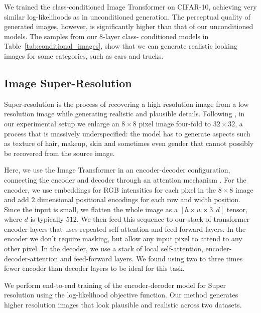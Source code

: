 \documentclass{article}
\newcommand{\height}{h}
\newcommand{\width}{w}
\newcommand{\modeldim}{d}
\begin{document}
We trained the class-conditioned Image Transformer on CIFAR-10, achieving very similar log-likelihoods as in unconditioned generation. The perceptual quality of generated images, however, is significantly higher than that of our unconditioned models. The samples from our $8$-layer class- conditioned models in Table~\ref{tab:conditional_images}, show that we can generate realistic looking images for some categories, such as cars and trucks.






\subsection{Image Super-Resolution}\label{sec:super-res}



Super-resolution is the process of recovering a high resolution image from a low resolution image while generating realistic and plausible details. Following \citep{PixelRecursiveSuperResolution}, in our experimental setup we enlarge an $8 \times 8$ pixel image four-fold to $32 \times 32$, a process that is massively underspecified: the model has to generate aspects such as texture of hair, makeup, skin and sometimes even gender that cannot possibly be recovered from the source image.

Here, we use the Image Transformer in an encoder-decoder configuration, connecting the encoder and decoder through an attention mechanism \citep{aiayn}. For the encoder, we use embeddings for RGB intensities for each pixel in the $8 \times $8 image and add $2$ dimensional positional encodings for each row and width position. Since the input is small, we flatten the whole image as a $[\height \times \width \times 3, \modeldim]$ tensor, where $\modeldim$ is typically $512$. We then feed this sequence to our stack of transformer encoder layers that uses repeated self-attention and feed forward layers. In the encoder we don't require masking, but allow any input pixel to attend to any other pixel. In the decoder, we use a stack of local self-attention, encoder-decoder-attention and feed-forward layers. We found using two to three times fewer encoder than decoder layers to be ideal for this task.

We perform end-to-end training of the encoder-decoder model for Super resolution using the log-likelihood objective function. Our method generates higher resolution images that look plausible and realistic across two datasets.
\end{document}
